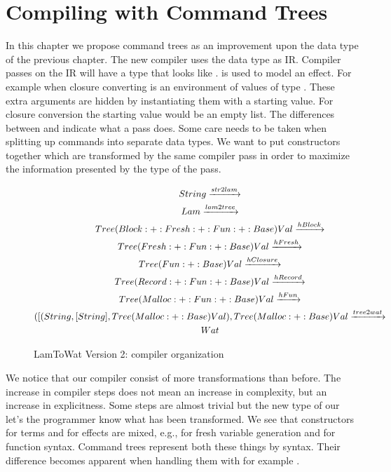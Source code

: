 
\chapter{\label{chap:treecomp}Compiling with Command Trees}

In this chapter we propose command trees as an improvement upon the  data type of the previous chapter. The new compiler uses the  data type as IR. Compiler passes on the IR will have a type that looks like .  is used to model an effect. For example when closure converting  is an environment of values of type . These extra arguments are hidden by instantiating them with a starting value. For closure conversion the starting value would be an empty list. The differences between  and  indicate what a pass does. Some care needs to be taken when splitting up commands into separate data types. We want to put constructors together which are transformed by the same compiler pass in order to maximize the information presented by the type of the pass.

\begin{figure}
\begin{gather*}
  String \xrightarrow{str2lam}\\
  Lam \xrightarrow{lam2tree}\\
  Tree (Block :+: Fresh :+: Fun :+: Base) Val \xrightarrow{hBlock}\\
  Tree (Fresh :+: Fun :+: Base) Val \xrightarrow{hFresh}\\
  Tree (Fun :+: Base) Val \xrightarrow{hClosure}\\
  Tree (Record :+: Fun :+: Base) Val \xrightarrow{hRecord}\\
  Tree (Malloc :+: Fun :+: Base) Val \xrightarrow{hFun}\\
  ([(String,[String],Tree (Malloc :+: Base) Val), Tree (Malloc :+: Base) Val \xrightarrow{tree2wat}\\
  Wat
\end{gather*}
\caption{LamToWat Version 2: compiler organization}
\label{fig:lam2watv2org}
\end{figure}

We notice that our compiler consist of more transformations than before. The increase in compiler steps does not mean an increase in complexity, but an increase in explicitness. Some steps are almost trivial but the new type of our  let's the programmer know what has been transformed. We see that constructors for terms and for effects are mixed, e.g.,  for fresh variable generation and  for function syntax. Command trees represent both these things by syntax. Their difference becomes apparent when handling them with for example .

